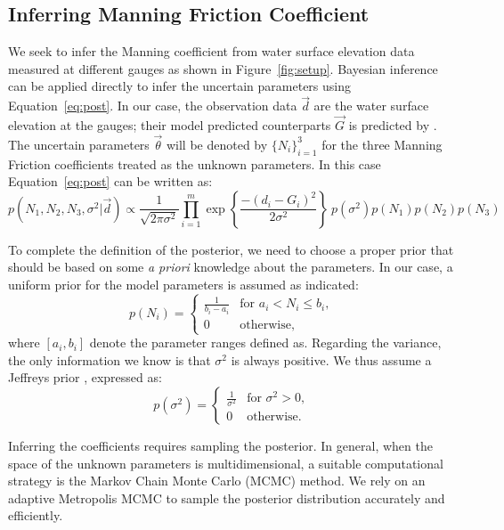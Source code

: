 \subsection{Inferring Manning Friction Coefficient}
 \label{sec:manning}
 
We seek to infer the Manning coefficient from water surface elevation
data measured at different gauges as shown in Figure~\ref{fig:setup}.
Bayesian inference can be applied directly to infer the uncertain parameters
using Equation~\ref{eq:post}. In our case, the observation data $\vec d$ 
are the water surface elevation at the gauges;
their model predicted counterparts $\vec G$ is predicted by \geoclaw.
The uncertain parameters $\vec \theta$ will be denoted by $\{N_i\}_{i=1}^3$ for the
three Manning Friction coefficients treated as the unknown parameters. 
In this case  Equation~\ref{eq:post} can be written as:
\begin{equation} 
p(N_1,N_2,N_3,\sigma^2 | \vec d) 
\propto \frac{1}{\sqrt{2 \pi \sigma^2}} 
 \prod_{i=1}^m  
\exp \left\lbrace \frac{-(d_i - G_i)^2}{2 \sigma^2} \right\rbrace
\ p(\sigma^2)p(N_1)p(N_2) p(N_3)
\label{eq:post_coef}
\end{equation}

To complete the definition of the posterior, we need to choose a proper prior that should be based 
on some \emph{a priori} knowledge about the parameters. In our case, a uniform
prior for the model parameters is assumed as indicated:
\begin{equation} 
p(N_i) = \begin{cases}
		\displaystyle \frac{1}{b_i-a_i} &\text{for~} a_i <  N_i \leq b_i ,  \\
		0 &\text{otherwise}  , 
\end{cases}
\end{equation}
where $ [a_i,b_i]$ denote the parameter ranges defined as.
Regarding the variance, the only information we know 
is that $\sigma^2$ is always positive.
We thus assume a Jeffreys prior \citep{sivia}, expressed as:
\begin{equation} 
p(\sigma^2) =  \begin{cases}
		\displaystyle \frac{1}{\sigma^2} &\text{for~} \sigma^2 > 0,  \\
		0 &\text{otherwise}. 
		\end{cases}
\label{eq:var_pr}
\end{equation}

Inferring the coefficients requires 
sampling the posterior. In general, when the space of the unknown 
parameters is multidimensional, a suitable computational strategy is 
the Markov Chain Monte  Carlo (MCMC) method. 
We rely on an adaptive Metropolis MCMC \citep{Gareth2009,Haario2001} to
sample the posterior distribution accurately and efficiently.


